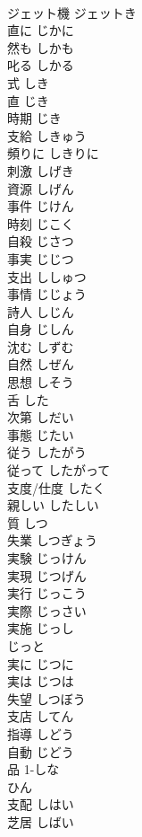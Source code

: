 \documentclass[8pt]{extreport}
\begin{document}
\begin{CJK}{UTF8}{min}
\\	ジェット機	ジェットき	
\\	直に	じかに	
\\	然も	しかも	
\\	叱る	しかる	
\\	式	しき	
\\	直	じき	
\\	時期	じき	
\\	支給	しきゅう	
\\	頻りに	しきりに	
\\	刺激	しげき	
\\	資源	しげん	
\\	事件	じけん	
\\	時刻	じこく	
\\	自殺	じさつ	
\\	事実	じじつ	
\\	支出	ししゅつ	
\\	事情	じじょう	
\\	詩人	しじん	
\\	自身	じしん	
\\	沈む	しずむ	
\\	自然	しぜん	
\\	思想	しそう	
\\	舌	した	
\\	次第	しだい	
\\	事態	じたい	
\\	従う	したがう	
\\	従って	したがって	
\\	支度/仕度	したく	
\\	親しい	したしい	
\\	質	しつ	
\\	失業	しつぎょう	
\\	実験	じっけん	
\\	実現	じつげん	
\\	実行	じっこう	
\\	実際	じっさい	
\\	実施	じっし	
\\	じっと		
\\	実に	じつに	
\\	実は	じつは	
\\	失望	しつぼう	
\\	支店	してん	
\\	指導	しどう	
\\	自動	じどう	
\\	品	1-しな 
\\	ひん	
\\	支配	しはい	
\\	芝居	しばい	

\end{CJK}
\end{document}
